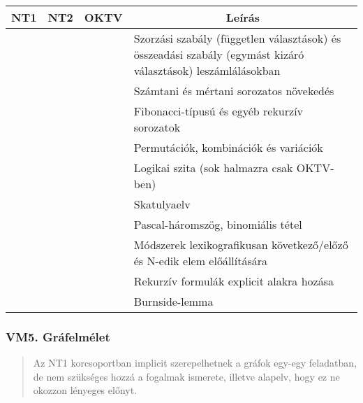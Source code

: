 \documentclass[a4paper,11pt,oneside]{article}
\newcommand{\cmark}{\ding{51}}%
\newcommand{\xmark}{\ding{55}}%
\newcommand{\CC}[1]{#1}
\newcommand{\cincl}{{\small\cmark}}
\newcommand{\cdefi}{{\small\cmark\faFileTextO}}
\newcommand{\ccode}{{\small\cmark\faFileText}}
\newcommand{\cemay}{{\small\xmark\faQuestionCircle}}
\newcommand{\cexcl}{{\small\xmark}}
\newcommand{\Iexcluded}{\item[\hbox to 1.8em{\cexcl\hfill}]}
\newcommand{\ctable}[1]{
    \begin{center}
        \begin{longtable}{ | C | C | C | m{8cm} | } %
        \hline
        \textbf{NT1} & \textbf{NT2} & \textbf{OKTV} & \multicolumn{1}{|c|}{\textbf{Leírás}} \\ \hline
        \endhead
        #1
        \end{longtable}
    \end{center}
}
\begin{document}
\ctable{
    \ccode & \ccode & \ccode & Szorzási szabály (független választások)
    és összeadási szabály (egymást kizáró választások) leszámlálásokban
    \\ \hline  %
    \ccode & \ccode & \ccode & Számtani és mértani sorozatos növekedés
    \\ \hline  %
    \ccode & \cdefi & \cdefi & Fibonacci-típusú és egyéb rekurzív sorozatok
    \\ \hline  %
    \cdefi & \cincl & \cincl & Permutációk, kombinációk és variációk
    \\ \hline  %
    \ccode & \ccode & \ccode & Logikai szita (sok halmazra csak OKTV-ben)
    \\ \hline  %
    \ccode & \ccode & \ccode & Skatulyaelv
    \\ \hline  %
    \cemay & \ccode & \ccode & Pascal-háromszög, binomiális tétel
    \\ \hline  %
    \ccode & \ccode & \ccode & Módszerek lexikografikusan következő/előző
    és N-edik elem előállítására
    \\ \hline  %
    \cexcl & \cexcl & \cexcl & Rekurzív formulák explicit alakra hozása
    \\ \hline  %
    \cexcl & \cexcl & \cexcl & Burnside-lemma
    \\ \hline  %
}



\subsubsection*{VM5. Gráfelmélet} %

    \begin{quote}
        Az NT1 korcsoportban implicit szerepelhetnek a gráfok egy-egy feladatban, de nem
        szükséges hozzá a fogalmak ismerete, illetve alapelv, hogy ez ne okozzon lényeges előnyt.
    \end{quote}
\end{document}
